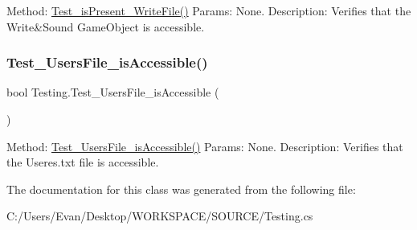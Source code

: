 Method\+: \mbox{\hyperlink{class_testing_add39eb411904617805391bdfe144fa1e}{Test\+\_\+is\+Present\+\_\+\+Write\+File()}} Params\+: None. Description\+: Verifies that the Write\&Sound Game\+Object is accessible. \mbox{\label{class_testing_a754f7be45cad9df07476d84d2fc08569}} 
\subsubsection{\texorpdfstring{Test\_UsersFile\_isAccessible()}{Test\_UsersFile\_isAccessible()}}
{\footnotesize\ttfamily bool Testing.\+Test\+\_\+\+Users\+File\+\_\+is\+Accessible (\begin{DoxyParamCaption}{ }\end{DoxyParamCaption})}

Method\+: \mbox{\hyperlink{class_testing_a754f7be45cad9df07476d84d2fc08569}{Test\+\_\+\+Users\+File\+\_\+is\+Accessible()}} Params\+: None. Description\+: Verifies that the Useres.\+txt file is accessible. 

The documentation for this class was generated from the following file\+:\begin{DoxyCompactItemize}
\item 
C\+:/\+Users/\+Evan/\+Desktop/\+W\+O\+R\+K\+S\+P\+A\+C\+E/\+S\+O\+U\+R\+C\+E/Testing.\+cs\end{DoxyCompactItemize}
